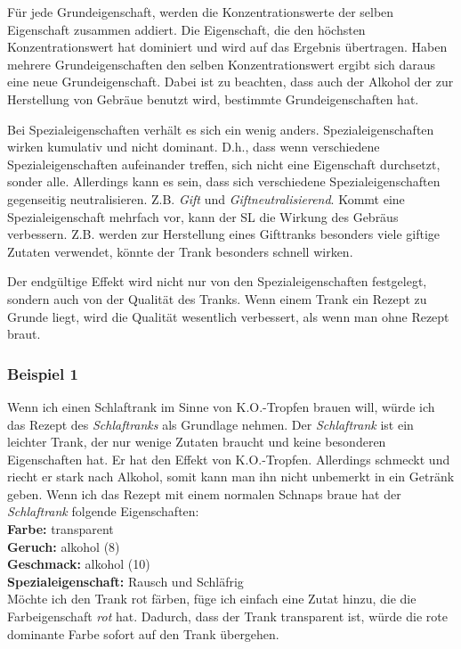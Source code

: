 Für jede Grundeigenschaft, werden die Konzentrationswerte der selben Eigenschaft zusammen addiert. Die Eigenschaft, die den höchsten Konzentrationswert hat dominiert und wird auf das Ergebnis übertragen. Haben mehrere Grundeigenschaften den selben Konzentrationswert ergibt sich daraus eine neue Grundeigenschaft. Dabei ist zu beachten, dass auch der Alkohol der zur Herstellung von Gebräue benutzt wird, bestimmte Grundeigenschaften hat. 

Bei Spezialeigenschaften verhält es sich ein wenig anders. Spezialeigenschaften wirken kumulativ und nicht dominant. D.h., dass wenn verschiedene Spezialeigenschaften aufeinander treffen, sich nicht eine Eigenschaft durchsetzt, sonder alle. Allerdings kann es sein, dass sich verschiedene Spezialeigenschaften gegenseitig neutralisieren. Z.B. \textit{Gift} und \textit{Giftneutralisierend}. Kommt eine Spezialeigenschaft mehrfach vor, kann der SL die Wirkung des Gebräus verbessern. Z.B. werden zur Herstellung eines Gifttranks besonders viele giftige Zutaten verwendet, könnte der Trank besonders schnell wirken.

Der endgültige Effekt wird nicht nur von den Spezialeigenschaften festgelegt, sondern auch von der Qualität des Tranks. Wenn einem Trank ein Rezept zu Grunde liegt, wird die Qualität wesentlich verbessert, als wenn man ohne Rezept braut.

\subsubsection{Beispiel 1}
Wenn ich einen Schlaftrank im Sinne von K.O.-Tropfen brauen will, würde ich das Rezept des \textit{Schlaftranks} als Grundlage nehmen. Der \textit{Schlaftrank} ist ein leichter Trank, der nur wenige Zutaten braucht und keine besonderen Eigenschaften hat. Er hat den Effekt von K.O.-Tropfen. Allerdings schmeckt und riecht er stark nach Alkohol, somit kann man ihn nicht unbemerkt in ein Getränk geben. Wenn ich das Rezept mit einem normalen Schnaps braue hat der \textit{Schlaftrank} folgende Eigenschaften:\\
\textbf{Farbe:} transparent \\
\textbf{Geruch:} alkohol (8) \\
\textbf{Geschmack:} alkohol (10) \\
\textbf{Spezialeigenschaft:} Rausch und Schläfrig \\

Möchte ich den Trank rot färben, füge ich einfach eine Zutat hinzu, die die Farbeigenschaft \textit{rot} hat. Dadurch, dass der Trank transparent ist, würde die rote dominante Farbe sofort auf den Trank übergehen. 

